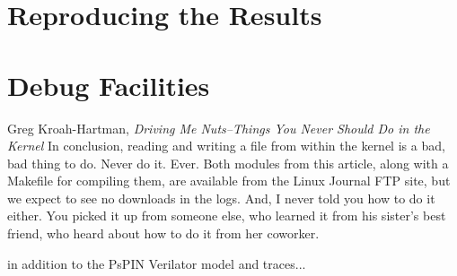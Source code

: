 \chapter{Reproducing the Results}


\chapter{Debug Facilities}
\begin{chapquote}{Greg Kroah-Hartman, \textit{Driving Me Nuts--Things You Never Should Do in the Kernel}}
In conclusion, reading and writing a file from within the kernel is a bad, bad thing to do. Never do it. Ever. Both modules from this article, along with a Makefile for compiling them, are available from the Linux Journal FTP site, but we expect to see no downloads in the logs. And, I never told you how to do it either. You picked it up from someone else, who learned it from his sister's best friend, who heard about how to do it from her coworker.
\end{chapquote}

in addition to the PsPIN Verilator model and traces...
